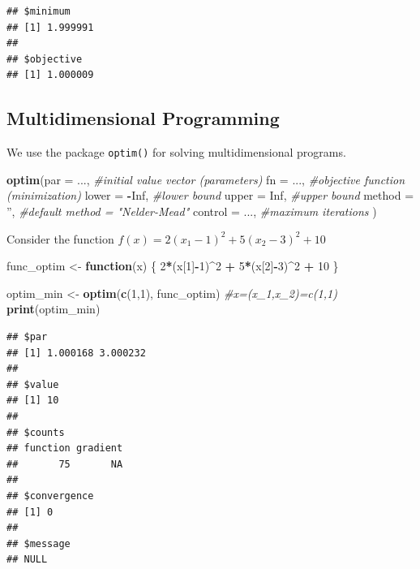 \documentclass[11pt,]{article}
\newenvironment{Shaded}{\begin{snugshade}}{\end{snugshade}}
\newcommand{\KeywordTok}[1]{\textcolor[rgb]{0.13,0.29,0.53}{\textbf{#1}}}
\newcommand{\DataTypeTok}[1]{\textcolor[rgb]{0.13,0.29,0.53}{#1}}
\newcommand{\DecValTok}[1]{\textcolor[rgb]{0.00,0.00,0.81}{#1}}
\newcommand{\StringTok}[1]{\textcolor[rgb]{0.31,0.60,0.02}{#1}}
\newcommand{\CommentTok}[1]{\textcolor[rgb]{0.56,0.35,0.01}{\textit{#1}}}
\newcommand{\OtherTok}[1]{\textcolor[rgb]{0.56,0.35,0.01}{#1}}
\newcommand{\ControlFlowTok}[1]{\textcolor[rgb]{0.13,0.29,0.53}{\textbf{#1}}}
\newcommand{\OperatorTok}[1]{\textcolor[rgb]{0.81,0.36,0.00}{\textbf{#1}}}
\newcommand{\NormalTok}[1]{#1}
\begin{document}
\begin{verbatim}
## $minimum
## [1] 1.999991
## 
## $objective
## [1] 1.000009
\end{verbatim}

\subsection{Multidimensional
Programming}\label{multidimensional-programming}

We use the package \texttt{optim()} for solving multidimensional
programs.

\begin{Shaded}
\begin{Highlighting}[]
\KeywordTok{optim}\NormalTok{(}\DataTypeTok{par =}\NormalTok{ ..., }\CommentTok{#initial value vector (parameters)}
      \DataTypeTok{fn =}\NormalTok{ ..., }\CommentTok{#objective function (minimization)}
      \DataTypeTok{lower =} \OperatorTok{-}\OtherTok{Inf}\NormalTok{, }\CommentTok{#lower bound}
      \DataTypeTok{upper =} \OtherTok{Inf}\NormalTok{, }\CommentTok{#upper bound}
      \DataTypeTok{method =} \StringTok{''}\NormalTok{, }\CommentTok{#default method = "Nelder-Mead"}
      \DataTypeTok{control =}\NormalTok{ ..., }\CommentTok{#maximum iterations}
\NormalTok{      )}
\end{Highlighting}
\end{Shaded}

Consider the function \(f(x) = 2(x_1-1)^2+5(x_2-3)^2+10\)

\begin{Shaded}
\begin{Highlighting}[]
\NormalTok{func_optim <-}\StringTok{ }\ControlFlowTok{function}\NormalTok{(x)}
\NormalTok{\{}
  \DecValTok{2}\OperatorTok{*}\NormalTok{(x[}\DecValTok{1}\NormalTok{]}\OperatorTok{-}\DecValTok{1}\NormalTok{)}\OperatorTok{^}\DecValTok{2} \OperatorTok{+}\StringTok{ }\DecValTok{5}\OperatorTok{*}\NormalTok{(x[}\DecValTok{2}\NormalTok{]}\OperatorTok{-}\DecValTok{3}\NormalTok{)}\OperatorTok{^}\DecValTok{2} \OperatorTok{+}\StringTok{ }\DecValTok{10}
\NormalTok{\}}

\NormalTok{optim_min <-}\StringTok{ }\KeywordTok{optim}\NormalTok{(}\KeywordTok{c}\NormalTok{(}\DecValTok{1}\NormalTok{,}\DecValTok{1}\NormalTok{), func_optim) }\CommentTok{#x=(x_1,x_2)=c(1,1)}
\KeywordTok{print}\NormalTok{(optim_min)}
\end{Highlighting}
\end{Shaded}

\begin{verbatim}
## $par
## [1] 1.000168 3.000232
## 
## $value
## [1] 10
## 
## $counts
## function gradient 
##       75       NA 
## 
## $convergence
## [1] 0
## 
## $message
## NULL
\end{verbatim}
\end{document}
